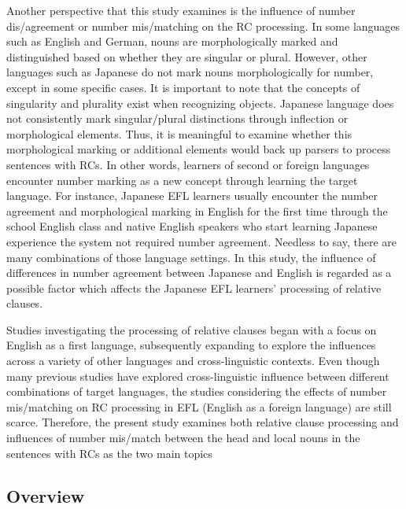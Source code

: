 \documentclass[
]{article}
\begin{document}
Another perspective that this study examines is the influence of number
dis/agreement or number mis/matching on the RC processing. In some
languages such as English and German, nouns are morphologically marked
and distinguished based on whether they are singular or plural. However,
other languages such as Japanese do not mark nouns morphologically for
number, except in some specific cases. It is important to note that the
concepts of singularity and plurality exist when recognizing objects.
Japanese language does not consistently mark singular/plural
distinctions through inflection or morphological elements. Thus, it is
meaningful to examine whether this morphological marking or additional
elements would back up parsers to process sentences with RCs. In other
words, learners of second or foreign languages encounter number marking
as a new concept through learning the target language. For instance,
Japanese EFL learners usually encounter the number agreement and
morphological marking in English for the first time through the school
English class and native English speakers who start learning Japanese
experience the system not required number agreement. Needless to say,
there are many combinations of those language settings. In this study,
the influence of differences in number agreement between Japanese and
English is regarded as a possible factor which affects the Japanese EFL
learners' processing of relative clauses.

Studies investigating the processing of relative clauses began with a
focus on English as a first language, subsequently expanding to explore
the influences across a variety of other languages and cross-linguistic
contexts. Even though many previous studies have explored
cross-linguistic influence between different combinations of target
languages, the studies considering the effects of number mis/matching on
RC processing in EFL (English as a foreign language) are still scarce.
Therefore, the present study examines both relative clause processing
and influences of number mis/match between the head and local nouns in
the sentences with RCs as the two main topics

\subsection{Overview}\label{overview}
\end{document}
